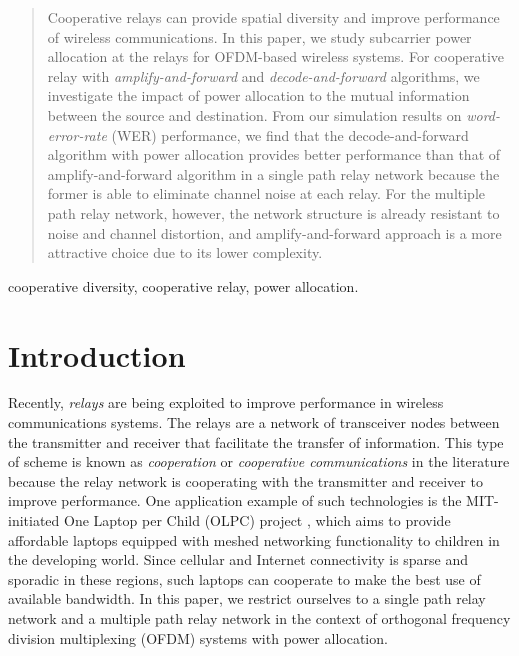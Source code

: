 \documentclass[journal]{IEEEtran}
\begin{document}
\begin{abstract}
Cooperative relays can provide spatial diversity and improve performance of wireless communications.  In this paper, we study subcarrier power allocation at the relays for OFDM-based wireless systems.  For cooperative relay with {\em amplify-and-forward} and {\em decode-and-forward} algorithms, we investigate the impact of power allocation to the mutual information between the source and destination.  From our simulation results on {\em word-error-rate} (WER) performance, we find that the decode-and-forward algorithm with power allocation provides better performance than that of amplify-and-forward algorithm in a single path relay network because the former is able to eliminate channel noise at each relay.  For the multiple path relay network, however, the network structure is already resistant to noise and channel distortion, and amplify-and-forward approach is a more attractive choice due to its lower complexity.
\end{abstract}

\begin{IEEEkeywords}
cooperative diversity, cooperative relay, power allocation.
\end{IEEEkeywords}

\IEEEpeerreviewmaketitle




\section{Introduction}
\label{sec:introduction}

Recently, \emph{relays} are being exploited to improve performance
in wireless communications systems.  The relays are a network of
transceiver nodes between the transmitter and receiver that
facilitate the transfer of information. This type of scheme is
known as \emph{cooperation} or \emph{cooperative communications}
in the literature because the relay network is cooperating with
the transmitter and receiver to improve performance.
One application example of such technologies is the MIT-initiated One
Laptop per Child (OLPC) project \cite{website:OLPC}, which aims to
provide affordable laptops equipped with meshed networking
functionality to children in the developing world.  Since cellular
and Internet connectivity is sparse and sporadic in these regions,
such laptops can cooperate to make the best use of available
bandwidth.  In this paper, we restrict ourselves to a single path relay
network and a multiple path relay network in the context of
orthogonal frequency division multiplexing (OFDM) systems with power allocation.
\end{document}
